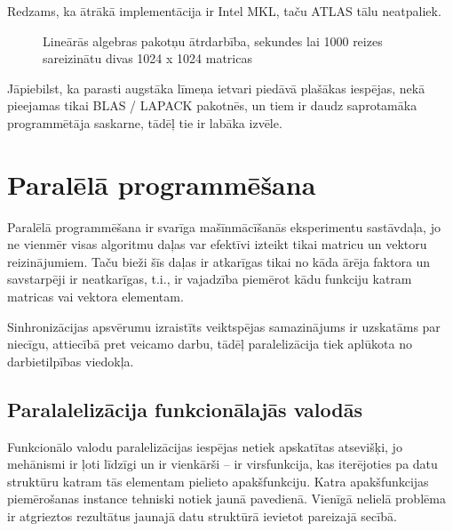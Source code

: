 \documentclass{ludis}
\begin{document}
Redzams, ka ātrākā implementācija ir Intel MKL, taču ATLAS tālu neatpaliek.
\begin{figure}[!hta]
  \centering
  \caption[Lineārās algebras pakotņu ātrdarbība]{Lineārās algebras pakotņu ātrdarbība, sekundes lai 1000 reizes sareizinātu divas 1024 x 1024 matricas}
  \label{fig:blas_performance}
\end{figure}

Jāpiebilst, ka parasti augstāka līmeņa ietvari piedāvā plašākas iespējas, nekā pieejamas tikai BLAS / LAPACK pakotnēs, un tiem ir daudz saprotamāka programmētāja saskarne, tādēļ tie ir labāka izvēle.

\section{Paralēlā programmēšana}
Paralēlā programmēšana ir svarīga mašīnmācīšanās eksperimentu sastāvdaļa, jo ne vienmēr visas algoritmu daļas var efektīvi izteikt tikai matricu un vektoru reizinājumiem. Taču bieži šīs daļas ir atkarīgas tikai no kāda ārēja faktora un savstarpēji ir neatkarīgas, t.i., ir vajadzība piemērot kādu funkciju katram matricas vai vektora elementam.

Sinhronizācijas apsvērumu izraistīts veiktspējas samazinājums ir uzskatāms par niecīgu, attiecībā pret veicamo darbu, tādēļ paralelizācija tiek aplūkota no darbietilpības viedokļa.

\subsection{Paralalelizācija funkcionālajās valodās}
Funkcionālo valodu paralelizācijas iespējas netiek apskatītas atsevišķi, jo mehānismi ir ļoti līdzīgi un ir vienkārši -- ir virsfunkcija, kas iterējoties pa datu struktūru katram tās elementam pielieto apakšfunkciju. Katra apakšfunkcijas piemērošanas instance tehniski notiek jaunā pavedienā. Vienīgā nelielā problēma ir atgrieztos rezultātus jaunajā datu struktūrā ievietot pareizajā secībā.
\end{document}
